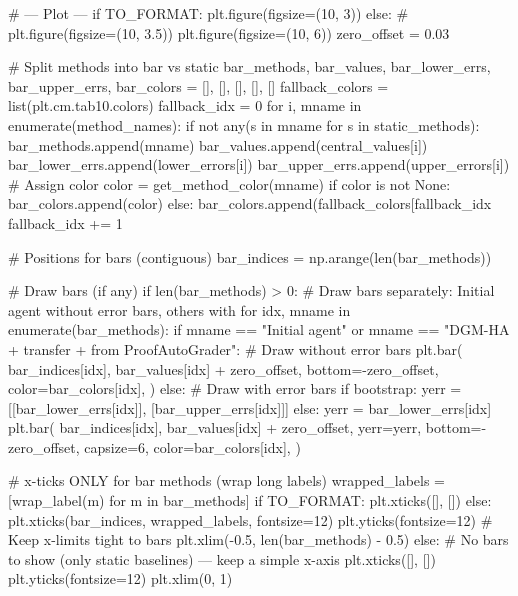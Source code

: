        # --- Plot ---
        if TO_FORMAT:
            plt.figure(figsize=(10, 3))
        else:
            # plt.figure(figsize=(10, 3.5))
            plt.figure(figsize=(10, 6))
        zero_offset = 0.03

        # Split methods into bar vs static
        bar_methods, bar_values, bar_lower_errs, bar_upper_errs, bar_colors = [], [], [], [], []
        fallback_colors = list(plt.cm.tab10.colors)
        fallback_idx = 0
        for i, mname in enumerate(method_names):
            if not any(s in mname for s in static_methods):
                bar_methods.append(mname)
                bar_values.append(central_values[i])
                bar_lower_errs.append(lower_errors[i])
                bar_upper_errs.append(upper_errors[i])
                # Assign color
                color = get_method_color(mname)
                if color is not None:
                    bar_colors.append(color)
                else:
                    bar_colors.append(fallback_colors[fallback_idx %
                    fallback_idx += 1

        # Positions for bars (contiguous)
        bar_indices = np.arange(len(bar_methods))

        # Draw bars (if any)
        if len(bar_methods) > 0:
            # Draw bars separately: Initial agent without error bars, others with
            for idx, mname in enumerate(bar_methods):
                if mname == "Initial agent" or mname == "DGM-HA + transfer + from ProofAutoGrader":
                    # Draw without error bars
                    plt.bar(
                        bar_indices[idx],
                        bar_values[idx] + zero_offset,
                        bottom=-zero_offset,
                        color=bar_colors[idx],
                    )
                else:
                    # Draw with error bars
                    if bootstrap:
                        yerr = [[bar_lower_errs[idx]], [bar_upper_errs[idx]]]
                    else:
                        yerr = bar_lower_errs[idx]
                    plt.bar(
                        bar_indices[idx],
                        bar_values[idx] + zero_offset,
                        yerr=yerr,
                        bottom=-zero_offset,
                        capsize=6,
                        color=bar_colors[idx],
                    )

            # x-ticks ONLY for bar methods (wrap long labels)
            wrapped_labels = [wrap_label(m) for m in bar_methods]
            if TO_FORMAT:
                plt.xticks([], [])
            else:
                plt.xticks(bar_indices, wrapped_labels, fontsize=12)
            plt.yticks(fontsize=12)
            # Keep x-limits tight to bars
            plt.xlim(-0.5, len(bar_methods) - 0.5)
        else:
            # No bars to show (only static baselines) — keep a simple x-axis
            plt.xticks([], [])
            plt.yticks(fontsize=12)
            plt.xlim(0, 1)

